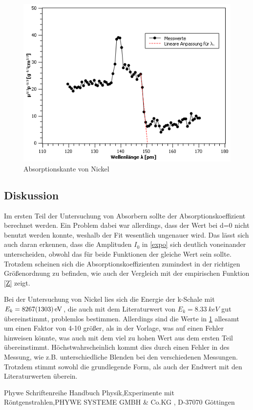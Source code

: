 \documentclass[
	a4paper,
	12pt,
	pagesize,
	ngerman
]{scrartcl}
\begin{document}
\begin{figure}[h!]
	\centering
	\includegraphics[scale = 1]{Absorptionskante.png}
	\caption{Absorptionskante von Nickel}
	\label{Kante}
\end{figure}

\subsection{Diskussion}
Im ersten Teil der Untersuchung von Absorbern sollte der Absorptionskoeffizient berechnet werden. Ein Problem dabei war allerdings, dass der Wert bei d=0 nicht benutzt werden konnte, weshalb der Fit wesentlich ungenauer wird. Das lässt sich auch daran erkennen, dass die Amplituden $I_{0}$ in \cref{expo} sich deutlich voneinander unterscheiden, obwohl das für beide Funktionen der gleiche Wert sein sollte. Trotzdem scheinen sich die Absorptionskoeffizienten zumindest in der richtigen Größenordnung zu befinden, wie auch der Vergleich mit der empirischen Funktion \cref{Z} zeigt.

Bei der Untersuchung von Nickel lies sich die Energie der k-Schale mit $E_{k} = \SI{8267 \pm 1303}{eV}$, die auch mit dem Literaturwert von $E_{k} = \SI{8,33}{keV}$ gut übereinstimmt, problemlos bestimmen. Allerdings sind die Werte in \cref{Kante} allesamt um einen Faktor von 4-10 größer, als in der Vorlage, was auf einen Fehler hinweisen könnte, was auch mit dem viel zu hohen Wert aus dem ersten Teil übereinstimmt. Höchstwahrscheinlich kommt dies durch einen Fehler in des Messung, wie z.B. unterschiedliche Blenden bei den verschiedenen Messungen. Trotzdem stimmt sowohl die grundlegende Form, als auch der Endwert mit den Literaturwerten überein. 
\begin{thebibliography}{9}
Phywe Schriftenreihe Handbuch Physik,Experimente mit Röntgenstrahlen,PHYWE SYSTEME GMBH \& Co.KG , D-37070 Göttingen
 \end{thebibliography}
\end{document}

